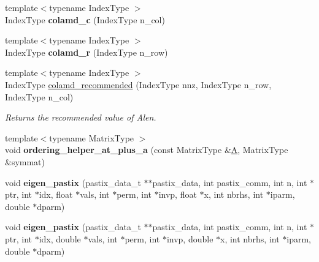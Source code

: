 \begin{DoxyCompactItemize}
{\footnotesize template$<$typename Index\+Type $>$ }\\Index\+Type {\bfseries colamd\+\_\+c} (Index\+Type n\+\_\+col)
\item 
\mbox{\label{namespace_eigen_1_1internal_a61271e07dc62bed8e3f0f9558ae4c785}} 
{\footnotesize template$<$typename Index\+Type $>$ }\\Index\+Type {\bfseries colamd\+\_\+r} (Index\+Type n\+\_\+row)
\item 
{\footnotesize template$<$typename Index\+Type $>$ }\\Index\+Type \hyperlink{namespace_eigen_1_1internal_a182742cb4291838dfc4cd1e5b2b95c65}{colamd\+\_\+recommended} (Index\+Type nnz, Index\+Type n\+\_\+row, Index\+Type n\+\_\+col)
\begin{DoxyCompactList}\small\item\em Returns the recommended value of Alen. \end{DoxyCompactList}\item 
\mbox{\label{namespace_eigen_1_1internal_a79d9939f88f7239eba14ff0f98d8a75d}} 
{\footnotesize template$<$typename Matrix\+Type $>$ }\\void {\bfseries ordering\+\_\+helper\+\_\+at\+\_\+plus\+\_\+a} (const Matrix\+Type \&\hyperlink{group___core___module_class_eigen_1_1_matrix}{A}, Matrix\+Type \&symmat)
\item 
\mbox{\label{namespace_eigen_1_1internal_ad4ee1ca4d2da070262fd90025e78e085}} 
void {\bfseries eigen\+\_\+pastix} (pastix\+\_\+data\+\_\+t $\ast$$\ast$pastix\+\_\+data, int pastix\+\_\+comm, int n, int $\ast$ptr, int $\ast$idx, float $\ast$vals, int $\ast$perm, int $\ast$invp, float $\ast$x, int nbrhs, int $\ast$iparm, double $\ast$dparm)
\item 
\mbox{\label{namespace_eigen_1_1internal_a8346483bbc2fdc1060016e43455fc767}} 
void {\bfseries eigen\+\_\+pastix} (pastix\+\_\+data\+\_\+t $\ast$$\ast$pastix\+\_\+data, int pastix\+\_\+comm, int n, int $\ast$ptr, int $\ast$idx, double $\ast$vals, int $\ast$perm, int $\ast$invp, double $\ast$x, int nbrhs, int $\ast$iparm, double $\ast$dparm)
\item 
\mbox{\label{namespace_eigen_1_1internal_a6e5b1ff23fcbefa6a72093bf432dc7f3}} 

\end{DoxyCompactItemize}
